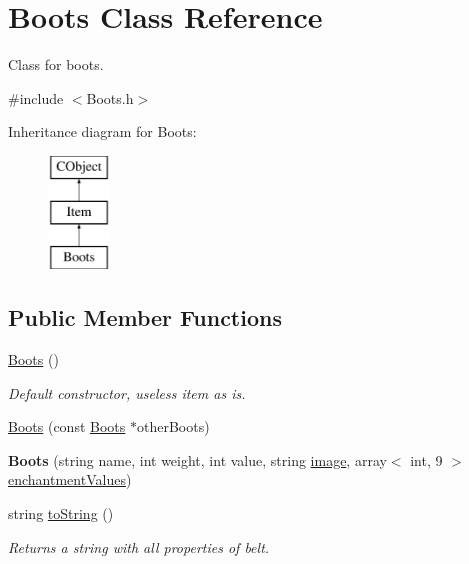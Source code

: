 \hypertarget{class_boots}{}\section{Boots Class Reference}
\label{class_boots}


Class for boots.  




{\ttfamily \#include $<$Boots.\+h$>$}

Inheritance diagram for Boots\+:\begin{figure}[H]
\begin{center}
\leavevmode
\includegraphics[height=3.000000cm]{class_boots}
\end{center}
\end{figure}
\subsection*{Public Member Functions}
\begin{DoxyCompactItemize}
\item 
\hypertarget{class_boots_abad208e963b53b1f29e269fc246a3485}{}\label{class_boots_abad208e963b53b1f29e269fc246a3485} 
\hyperlink{class_boots_abad208e963b53b1f29e269fc246a3485}{Boots} ()
\begin{DoxyCompactList}\small\item\em Default constructor, useless item as is. \end{DoxyCompactList}\item 
\hyperlink{class_boots_ad3452c78ef60ba4d955e779560d5e5ba}{Boots} (const \hyperlink{class_boots}{Boots} $\ast$other\+Boots)
\item 
\hypertarget{class_boots_adbbf30b0b77d0124262315aeb01647a2}{}\label{class_boots_adbbf30b0b77d0124262315aeb01647a2} 
{\bfseries Boots} (string name, int weight, int value, string \hyperlink{class_item_add84a42b692ee5d580a92ae4a922f784}{image}, array$<$ int, 9 $>$ \hyperlink{class_item_a8532d8729f9433f41b7fc18b20d83236}{enchantment\+Values})
\item 
\hypertarget{class_boots_a04f5b9cfcb60e479cf03321abeebec6d}{}\label{class_boots_a04f5b9cfcb60e479cf03321abeebec6d} 
string \hyperlink{class_boots_a04f5b9cfcb60e479cf03321abeebec6d}{to\+String} ()
\begin{DoxyCompactList}\small\item\em Returns a string with all properties of belt. \end{DoxyCompactList}\end{DoxyCompactItemize}
